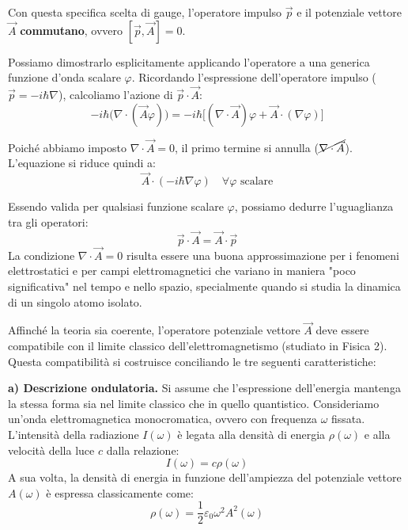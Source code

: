 Con questa specifica scelta di gauge, l'operatore impulso \( \vec{p} \) e il potenziale vettore \( \vec{A} \) \textbf{commutano}, ovvero \( [\vec{p}, \vec{A}] = 0 \). 

Possiamo dimostrarlo esplicitamente applicando l'operatore a una generica funzione d'onda scalare \( \varphi \). Ricordando l'espressione dell'operatore impulso (\( \vec{p} = -i\hbar\nabla \)), calcoliamo l'azione di \( \vec{p} \cdot \vec{A} \):
\begin{equation}
    -i\hbar \big( \nabla \cdot (\vec{A} \varphi) \big) = -i\hbar \big[ (\nabla \cdot \vec{A})\varphi + \vec{A} \cdot (\nabla \varphi) \big]
\end{equation}

Poiché abbiamo imposto \( \nabla \cdot \vec{A} = 0 \), il primo termine si annulla (\( \cancel{\nabla \cdot \vec{A}} \)). L'equazione si riduce quindi a:
\begin{equation}
    \vec{A} \cdot (-i\hbar \nabla \varphi) \quad \forall \varphi \text{ scalare}
\end{equation}

Essendo valida per qualsiasi funzione scalare \( \varphi \), possiamo dedurre l'uguaglianza tra gli operatori:
\begin{equation}
    \vec{p} \cdot \vec{A} = \vec{A} \cdot \vec{p}
\end{equation}
La condizione \( \nabla \cdot \vec{A} = 0 \) risulta essere una buona approssimazione per i fenomeni elettrostatici e per campi elettromagnetici che variano in maniera "poco significativa" nel tempo e nello spazio, specialmente quando si studia la dinamica di un singolo atomo isolato.

Affinché la teoria sia coerente, l'operatore potenziale vettore \( \vec{A} \) deve essere compatibile con il limite classico dell'elettromagnetismo (studiato in Fisica 2). Questa compatibilità si costruisce conciliando le tre seguenti caratteristiche:

\textbf{a) Descrizione ondulatoria.} Si assume che l'espressione dell'energia mantenga la stessa forma sia nel limite classico che in quello quantistico. Consideriamo un'onda elettromagnetica monocromatica, ovvero con frequenza \( \omega \) fissata. L'intensità della radiazione \( I(\omega) \) è legata alla densità di energia \( \rho(\omega) \) e alla velocità della luce \( c \) dalla relazione:
\begin{equation}
    I(\omega) = c \rho(\omega)
\end{equation}
A sua volta, la densità di energia in funzione dell'ampiezza del potenziale vettore \( A(\omega) \) è espressa classicamente come:
\begin{equation}
    \rho(\omega) = \frac{1}{2} \varepsilon_0 \omega^2 A^2(\omega)
\end{equation}

